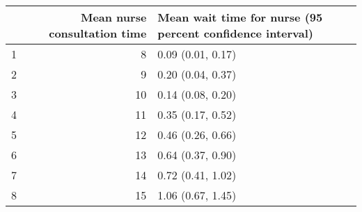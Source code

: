 \begin{table}[ht]
\centering
\begin{tabular}{rrl}
  \hline
 & Mean nurse consultation time & Mean wait time for nurse (95 percent confidence interval) \\ 
  \hline
1 &   8 & 0.09 (0.01, 0.17) \\ 
  2 &   9 & 0.20 (0.04, 0.37) \\ 
  3 &  10 & 0.14 (0.08, 0.20) \\ 
  4 &  11 & 0.35 (0.17, 0.52) \\ 
  5 &  12 & 0.46 (0.26, 0.66) \\ 
  6 &  13 & 0.64 (0.37, 0.90) \\ 
  7 &  14 & 0.72 (0.41, 1.02) \\ 
  8 &  15 & 1.06 (0.67, 1.45) \\ 
   \hline
\end{tabular}
\end{table}
